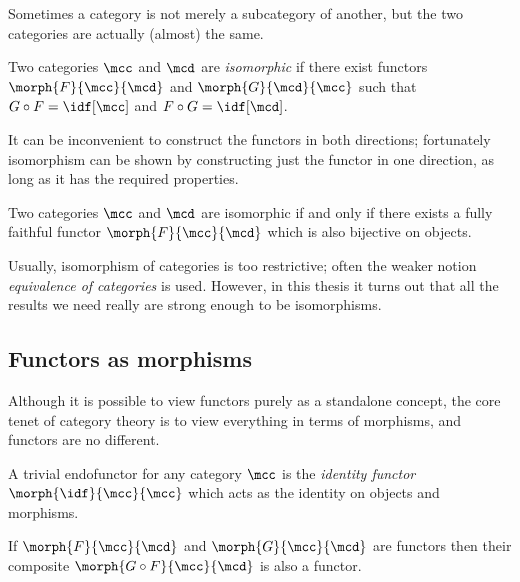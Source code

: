 Sometimes a category is not merely a subcategory of another, but the two
categories are actually (almost) the same.

\begin{definition}
    Two categories \(\mcc\) and \(\mcd\) are \emph{isomorphic} if there exist
    functors \(\morph{F}{\mcc}{\mcd}\) and \(\morph{G}{\mcd}{\mcc}\) such that
    \(G \circ F = \idf[\mcc]\) and \(F \circ G = \idf[\mcd]\).
\end{definition}

It can be inconvenient to construct the functors in both directions; fortunately
isomorphism can be shown by constructing just the functor in one direction, as
long as it has the required properties.

\begin{lemma}
    Two categories \(\mcc\) and \(\mcd\) are isomorphic if and only if there
    exists a fully faithful functor \(\morph{F}{\mcc}{\mcd}\) which is also
    bijective on objects.
\end{lemma}

\begin{remark}
    Usually, isomorphism of categories is too restrictive; often the weaker
    notion \emph{equivalence of categories} is used.
    However, in this thesis it turns out that all the results we need really are
    strong enough to be isomorphisms.
\end{remark}

\subsection{Functors as morphisms}

Although it is possible to view functors purely as a standalone concept, the
core tenet of category theory is to view everything in terms of morphisms, and
functors are no different.

\begin{example}
    A trivial endofunctor for any category \(\mcc\) is the
    \emph{identity functor} \(\morph{\idf}{\mcc}{\mcc}\) which acts as the
    identity on objects and morphisms.
\end{example}

\begin{example}
    If \(\morph{F}{\mcc}{\mcd}\) and \(\morph{G}{\mcc}{\mcd}\) are functors
    then their composite \(\morph{G \circ F}{\mcc}{\mcd}\) is also a functor.
\end{example}

